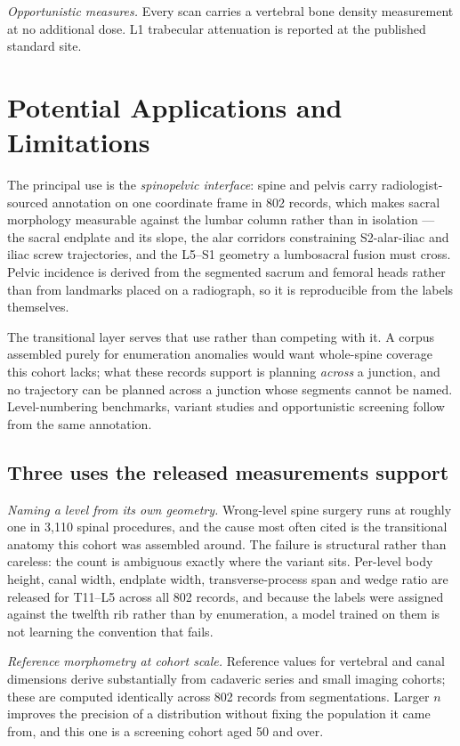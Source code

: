 \documentclass[aapm,mph,amsmath,amssymb,reprint,linenumbers]{revtex4-2}
\begin{document}
\emph{Opportunistic measures.} Every scan carries a
vertebral bone density measurement at no additional dose.\cite{pickhardt2013} L1 trabecular attenuation is
reported at the published standard site.

\section{Potential Applications and Limitations}

The principal use is the \emph{spinopelvic interface}: spine and pelvis carry
radiologist-sourced annotation on one coordinate frame in 802 records, which makes sacral
morphology measurable against the lumbar column rather than in isolation --- the sacral
endplate and its slope, the alar corridors constraining S2-alar-iliac and iliac screw
trajectories, and the L5--S1 geometry a lumbosacral fusion must cross. Pelvic incidence is
derived from the segmented sacrum and femoral heads rather than from landmarks placed on a
radiograph, so it is reproducible from the labels themselves.

The transitional layer serves that use rather than competing with it. A corpus assembled
purely for enumeration anomalies would want whole-spine coverage this cohort lacks; what
these records support is planning \emph{across} a junction, and no trajectory can be planned
across a junction whose segments cannot be named. Level-numbering benchmarks, variant
studies and opportunistic screening follow from the same
annotation.

\subsection{Three uses the released measurements support}

\emph{Naming a level from its own geometry.} Wrong-level spine surgery runs at roughly one in
3{,}110 spinal procedures, and the cause most often cited is the transitional anatomy this
cohort was assembled around.\cite{epstein2021} The failure is structural rather than careless:
the count is ambiguous exactly where the variant sits. Per-level body height, canal width,
endplate width, transverse-process span and wedge ratio are released for T11--L5 across all
802 records, and because the labels were assigned against the twelfth rib rather than by
enumeration, a model trained on them is not learning the convention that fails.

\emph{Reference morphometry at cohort scale.} Reference values for vertebral and canal
dimensions derive substantially from cadaveric series and small imaging
cohorts;\cite{benzel2015} these are computed identically across 802 records from
segmentations. Larger $n$ improves the precision of a distribution without fixing the
population it came from, and this one is a screening cohort aged 50 and over.
\end{document}

